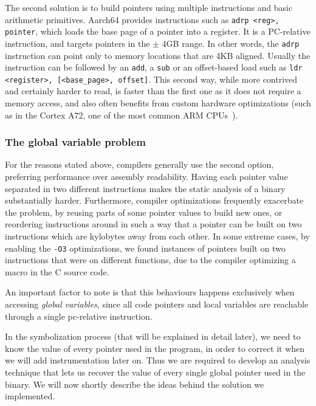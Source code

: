 \documentclass[a4paper,11pt,oneside]{report}
\begin{document}
The second solution is to build pointers using multiple instructions and basic 
arithmetic primitives. Aarch64 provides instructions such as \texttt{adrp 
<reg>, pointer}, which loads the base page of a pointer into a register. It is 
a PC-relative instruction, and targets pointers in the $\pm$ 4GB range.  In 
other words, the \texttt{adrp} instruction can point only to memory locations 
that are 4KB aligned. Usually the instruction can be followed by an 
\texttt{add}, a \texttt{sub} or an offset-based load such as \texttt{ldr 
<register>, [<base\_page>, offset]}. This second way, while more contrived and 
certainly harder to read, is faster than the first one as it does not require a 
memory access, and also often benefits from custom hardware optimizations (such 
as in the Cortex A72, one of the most common ARM 
CPUs~\cite{pointeroptimizations}). 

\subsubsection{The global variable problem}
For the reasons stated above, compilers generally use the second option, 
preferring performance over assembly readability. Having each pointer value 
separated in two different instructions makes the static analysis of a binary 
substantially harder. Furthermore, compiler optimizations frequently exacerbate 
the problem, by reusing parts of some pointer values to build new ones, or 
reordering instructions around in such a way that a pointer can be built on two 
instructions which are kylobytes away from each other. In some extreme cases, 
by enabling the \texttt{-O3} optimizations, we found instances of pointers 
built on two instructions that were on different functions, due to the compiler 
optimizing a macro in the C source code. 

An important factor to note is that this behaviours happens exclusively when 
accessing \emph{global variables}, since all code pointers and local variables 
are reachable through a single pc-relative instruction. 

In the symbolization process (that will be explained in detail later), we need 
to know the value of every pointer used in the program, in order to correct it 
when we will add instrumentation later on. Thus we are required to develop an 
analysis technique that lets us recover the value of every single global 
pointer used in the binary. We will now shortly describe the ideas behind the 
solution we implemented.
\end{document}
